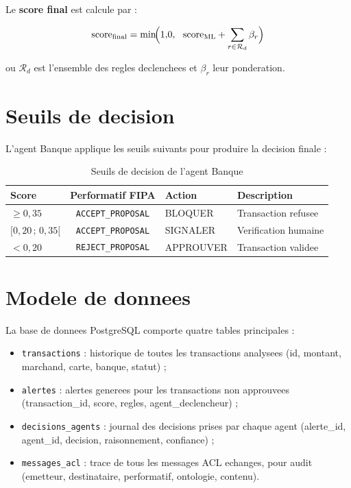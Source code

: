 \documentclass[12pt,a4paper,oneside]{report}
\begin{document}
Le \textbf{score final} est calcule par :

\begin{equation}
  \text{score}_{\text{final}} = \min\!\Bigl(1{,}0,~~ \text{score}_{\text{ML}}
                                        + \sum_{r \in \mathcal{R}_d} \beta_r \Bigr)
\end{equation}

ou $\mathcal{R}_d$ est l'ensemble des regles declenchees et $\beta_r$ leur
ponderation.

\section{Seuils de decision}

L'agent Banque applique les seuils suivants pour produire la decision finale :

\begin{table}[H]
\centering
\caption{Seuils de decision de l'agent Banque}
\label{tab:seuils-banque}
\renewcommand{\arraystretch}{1.3}
\begin{tabularx}{\textwidth}{l c l X}
\toprule
\textbf{Score} & \textbf{Performatif FIPA} & \textbf{Action} & \textbf{Description} \\
\midrule
$\geq 0{,}35$ & \texttt{ACCEPT\_PROPOSAL} & BLOQUER  & Transaction refusee \\
$[0{,}20\,;\,0{,}35[$ & \texttt{ACCEPT\_PROPOSAL} & SIGNALER & Verification humaine \\
$< 0{,}20$ & \texttt{REJECT\_PROPOSAL} & APPROUVER & Transaction validee \\
\bottomrule
\end{tabularx}
\end{table}

\section{Modele de donnees}

La base de donnees PostgreSQL comporte quatre tables principales :

\begin{itemize}[leftmargin=*]
  \item \texttt{transactions} : historique de toutes les transactions
        analysees (id, montant, marchand, carte, banque, statut) ;
  \item \texttt{alertes} : alertes generees pour les transactions non
        approuvees (transaction\_id, score, regles, agent\_declencheur) ;
  \item \texttt{decisions\_agents} : journal des decisions prises par chaque
        agent (alerte\_id, agent\_id, decision, raisonnement, confiance) ;
  \item \texttt{messages\_acl} : trace de tous les messages ACL echanges,
        pour audit (emetteur, destinataire, performatif, ontologie, contenu).
\end{itemize}
\end{document}
